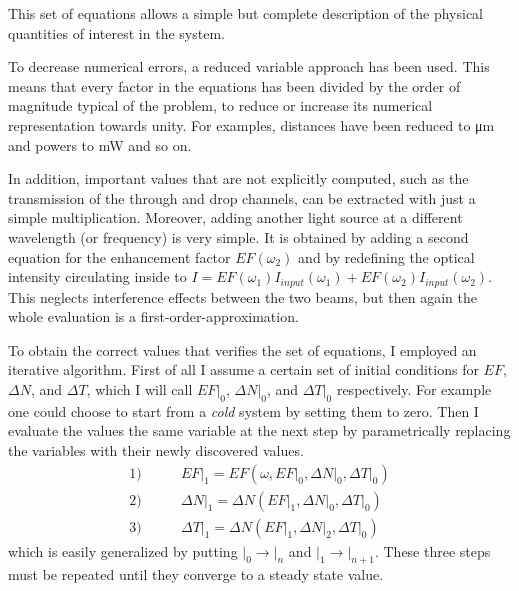 This set of equations allows a simple but complete description of the physical quantities of interest in the system.

To decrease numerical errors, a reduced variable approach has been used.
This means that every factor in the equations has been divided by the order of magnitude typical of the problem, to reduce or increase its numerical representation towards unity.
For examples, distances have been reduced to \si{\um} and powers to \si{\mW} and so on.

In addition, important values that are not explicitly computed, such as the transmission of the through and drop channels, can be extracted with just a simple multiplication.
Moreover, adding another light source at a different wavelength (or frequency) is very simple.
It is obtained by adding a second equation for the enhancement factor $EF(\omega_2)$ and by redefining the optical intensity circulating inside to $I = EF\left(\omega_1\right)I_{input}\left(\omega_1\right) + EF\left(\omega_2\right)I_{input}\left(\omega_2\right)$.
This neglects interference effects between the two beams, but then again the whole evaluation is a first-order-approximation.

To obtain the correct values that verifies the set of equations, I employed an iterative algorithm.
First of all I assume a certain set of initial conditions for $EF$, $\Delta N$, and $\Delta T$, which I will call $\left.EF\right|_0$, $\left.\Delta N\right|_0$, and $\left.\Delta T\right|_0$ respectively.
For example one could choose to start from a \textit{cold} system by setting them to zero.
Then I evaluate the values the same variable at the next step by parametrically replacing the variables with their newly discovered values.
\begin{align*}
1) \qquad &\left.EF\right|_1=EF(\omega,\left.EF\right|_0,\left.\Delta N\right|_0,\left.\Delta T\right|_0) \\
2) \qquad &\left.\Delta N\right|_1 = \Delta N(\left.EF\right|_1,\left.\Delta N\right|_0,\left.\Delta T\right|_0) \\
3) \qquad &\left.\Delta T\right|_1 = \Delta N(\left.EF\right|_1,\left.\Delta N\right|_2,\left.\Delta T\right|_0)
\end{align*}
which is easily generalized by putting $\left.\right|_0 \rightarrow \left.\right|_n$ and $\left.\right|_1 \rightarrow \left.\right|_{n+1}$.
These three steps must be repeated until they converge to a steady state value.

